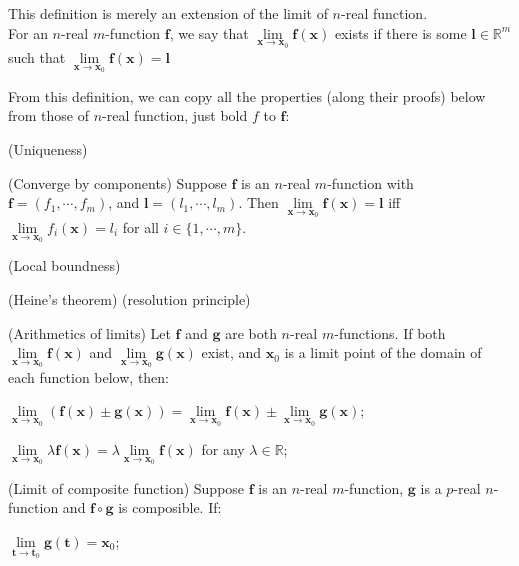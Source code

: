 \documentclass{article}
\begin{document}
\begin{Rmk}{}
    This definition is merely an extension of the limit of $n$-real function.\\
    \textcolor{Df}{For an $n$-real $m$-function $\pmb{f}$, we say that $\lim\limits_{\pmb{x}\to \pmb{x}_0} \pmb{f}(\pmb{x})$ exists if there is some $\pmb{l}\in\mathbb{R}^m$ such that $\lim\limits_{\pmb{x}\to \pmb{x}_0} \pmb{f}(\pmb{x}) = \pmb{l}$}\\
    \textcolor{Th}{From this definition, we can copy all the properties (along their proofs) below from those of $n$-real function, just bold $f$ to $\pmb{f}$:
    \begin{compactenum}
        \item (Uniqueness)
        \item (Converge by components) Suppose $\pmb{f}$ is an $n$-real $m$-function with $\pmb{f} = (f_1, \cdots, f_m)$, and $\pmb{l} = (l_1, \cdots, l_m)$. Then $\lim\limits_{\pmb{x}\to\pmb{x}_0}\pmb{f}(\pmb{x}) = \pmb{l}$ iff $\lim\limits_{\pmb{x}\to\pmb{x}_0}f_i(\pmb{x}) = l_i$ for all $i\in\{1,\cdots,m\}$.
        \item (Local boundness)
        \item (Heine's theorem) (resolution principle) 
        \item (Arithmetics of limits) Let $\pmb{f}$ and $\pmb{g}$ are both $n$-real $m$-functions. If both $\lim\limits_{\pmb{x}\rightarrow \pmb{x}_0} \pmb{f}(\pmb{x})$ and $\lim\limits_{\pmb{x}\rightarrow \pmb{x}_0} \pmb{g}(\pmb{x})$ exist, and $\pmb{x}_0$ is a limit point of the domain of each function below, then:
        \begin{compactitem}
            \item $\lim\limits_{\pmb{x}\rightarrow \pmb{x}_0} (\pmb{f}(\pmb{x})\pm \pmb{g}(\pmb{x})) = \lim\limits_{\pmb{x}\rightarrow \pmb{x}_0} \pmb{f}(\pmb{x}) \pm \lim\limits_{\pmb{x}\rightarrow \pmb{x}_0} \pmb{g}(\pmb{x})$;
            \item $\lim\limits_{\pmb{x}\rightarrow \pmb{x}_0} \lambda\pmb{f}(\pmb{x}) = \lambda\lim\limits_{\pmb{x}\rightarrow \pmb{x}_0} \pmb{f}(\pmb{x})$ for any $\lambda\in\mathbb{R}$;
        \end{compactitem}
        \item (Limit of composite function) Suppose $\pmb{f}$ is an $n$-real $m$-function, $\pmb{g}$ is a $p$-real $n$-function and $\pmb{f}\circ\pmb{g}$ is composible. If:
        \begin{compactenum}
            \item $\lim\limits_{\pmb{t}\to\pmb{t}_0} \pmb{g}(\pmb{t}) = \pmb{x}_0$;

\end{compactenum}
\end{compactenum}}
\end{Rmk}
\end{document}
